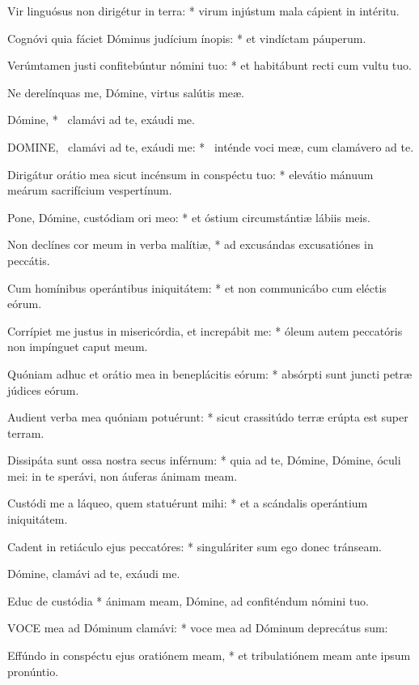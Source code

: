 Vir linguósus non dirigétur in terra: * virum injústum mala cápient in intéritu.

Cognóvi quia fáciet Dóminus judícium ínopis: * et vindíctam páuperum.

Verúmtamen justi confitebúntur nómini tuo: * et habitábunt recti cum vultu tuo.

 Ne derelínquas me, Dómine, virtus salútis meæ.

 Dómine, * \textdagger\ clamávi ad te, exáudi me. \textdaggerdbl


\lettrine[lines=2]{D}{OMINE}, \textdagger\ clamávi ad te, exáudi me: * \textdaggerdbl\ inténde voci meæ, cum clamávero ad te.

Dirigátur orátio mea sicut incénsum in conspéctu tuo: * elevátio mánuum meárum sacrifícium vespertínum.

Pone, Dómine, custódiam ori meo: * et óstium circumstántiæ lábiis meis.

Non declínes cor meum in verba malítiæ, * ad excusándas excusatiónes in peccátis.

Cum homínibus operántibus iniquitátem: * et non communicábo cum eléctis eórum.

Corrípiet me justus in misericórdia, et increpábit me: * óleum autem peccatóris non impínguet caput meum.

Quóniam adhuc et orátio mea in beneplácitis eórum: * absórpti sunt juncti petræ júdices eórum.

Audient verba mea quóniam potuérunt: * sicut crassitúdo terræ erúpta est super terram.

Dissipáta sunt ossa nostra secus inférnum: * quia ad te, Dómine, Dómine, óculi mei: in te sperávi, non áuferas ánimam meam.

Custódi me a láqueo, quem statuérunt mihi: * et a scándalis operántium iniquitátem.

Cadent in retiáculo ejus peccatóres: * singuláriter sum ego donec tránseam.

 Dómine, clamávi ad te, exáudi me.

 Educ de custódia * ánimam meam, Dómine, ad confiténdum nómini tuo.


\lettrine[lines=2]{V}{OCE} mea ad Dóminum clamávi: * voce mea ad Dóminum deprecátus sum:

Effúndo in conspéctu ejus oratiónem meam, * et tribulatiónem meam ante ipsum pronúntio.

